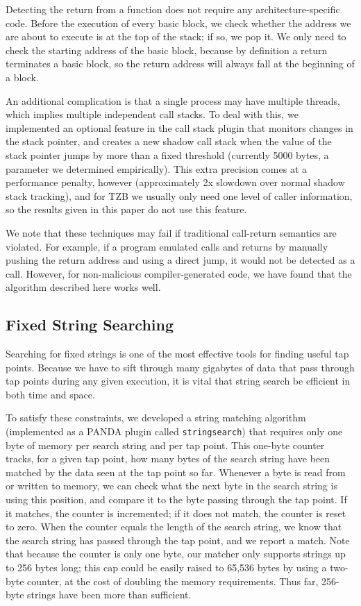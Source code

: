 Detecting the return from a function does not require any
architecture-specific code. Before the execution of every basic block,
we check whether the address we are about to execute is at the top of
the stack; if so, we pop it. We only need to check the starting address
of the basic block, because by definition a return terminates a basic
block, so the return address will always fall at the beginning of a
block.

An additional complication is that a single process may have multiple
threads, which implies multiple independent call stacks. To deal with
this, we implemented an optional feature in the call stack plugin that
monitors changes in the stack pointer, and creates a new shadow call
stack when the value of the stack pointer jumps by more than a fixed
threshold (currently 5000 bytes, a parameter we determined empirically).
This extra precision comes at a performance penalty, however
(approximately 2x slowdown over normal shadow stack tracking), and for
TZB we usually only need one level of caller information, so the results
given in this paper do not use this feature.

We note that these techniques may fail if traditional call-return
semantics are violated. For example, if a program emulated calls and
returns by manually pushing the return address and using a direct jump,
it would not be detected as a call. However, for non-malicious
compiler-generated code, we have found that the algorithm described here
works well.

\subsection{Fixed String Searching}
\label{sec:implementation:subsec:stringsearch}

Searching for fixed strings is one of the most effective tools for
finding useful tap points. Because we have to sift through many
gigabytes of data that pass through tap points during any given
execution, it is vital that string search be efficient in both time and
space.

To satisfy these constraints, we developed a string matching algorithm
(implemented as a PANDA plugin called \texttt{stringsearch}) that
requires only one byte of memory per search string and per tap point.
This one-byte counter tracks, for a given tap point, how many bytes of
the search string have been matched by the data seen at the tap point so
far. Whenever a byte is read from or written to memory, we can check
what the next byte in the search string is using this position, and
compare it to the byte passing through the tap point. If it matches, the
counter is incremented; if it does not match, the counter is reset to
zero. When the counter equals the length of the search string, we know
that the search string has passed through the tap point, and we report a
match. Note that because the counter is only one byte, our matcher only
supports strings up to 256 bytes long; this cap could be easily raised
to 65,536 bytes by using a two-byte counter, at the cost of doubling the
memory requirements. Thus far, 256-byte strings have been more than
sufficient.

